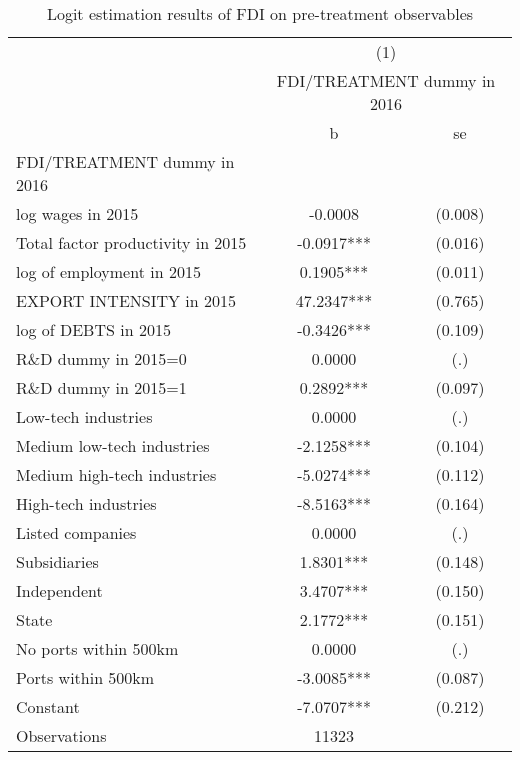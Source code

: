\begin{table}[htbp]\centering
\def\sym#1{\ifmmode^{#1}\else\(^{#1}\)\fi}
\caption{Logit estimation results of FDI on pre-treatment observables \label{selection\_logit}}
\begin{tabular}{l*{1}{cc}}
\hline\hline
                &\multicolumn{2}{c}{(1)}\\
                &\multicolumn{2}{c}{FDI/TREATMENT dummy in 2016}\\
                &        b   &       se\\
\hline
FDI/TREATMENT dummy in 2016&            &         \\
log wages in 2015&  -0.0008   &  (0.008)\\
Total factor productivity in 2015&  -0.0917***&  (0.016)\\
log of employment in 2015&   0.1905***&  (0.011)\\
EXPORT INTENSITY in 2015&  47.2347***&  (0.765)\\
 log of DEBTS in 2015&  -0.3426***&  (0.109)\\
R\&D dummy in 2015=0&   0.0000   &      (.)\\
R\&D dummy in 2015=1&   0.2892***&  (0.097)\\
Low-tech industries&   0.0000   &      (.)\\
Medium low-tech industries&  -2.1258***&  (0.104)\\
Medium high-tech industries&  -5.0274***&  (0.112)\\
High-tech industries&  -8.5163***&  (0.164)\\
 Listed companies&   0.0000   &      (.)\\
 Subsidiaries   &   1.8301***&  (0.148)\\
 Independent    &   3.4707***&  (0.150)\\
 State          &   2.1772***&  (0.151)\\
No ports within 500km&   0.0000   &      (.)\\
Ports within 500km&  -3.0085***&  (0.087)\\
Constant        &  -7.0707***&  (0.212)\\
\hline
Observations    &    11323   &         \\
\hline\hline
\end{tabular}
\end{table}
